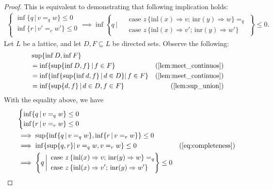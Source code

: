 \begin{proof}
   This is equivalent to demonstrating that following implication holds:
   \begin{align*}
    \begin{cases}
      \inf \{ q \, \vert \, v=_q w \} \leq 0 \\
      \inf \{ r \, \vert \, v'=_r w' \} \leq 0 \\
    \end{cases} \implies \inf \left\{q \, \bigg\vert \,  
    \begin{aligned}
       &\text{ case } z \,   \{\text{inl} (x) \Rightarrow v ; \, \text{inr} (y) \Rightarrow w\} =_{q} \\
       &\text{ case } z \,  \{\text{inl} (x) \Rightarrow v' ; \,\text{inr} (y) \Rightarrow w'\}
    \end{aligned}\right\} \leq 0.
   \end{align*}
Let $L$ be a lattice, and let $D, F \subseteq L$ be directed sets. Observe the following:
\begin{equation} \label{eq:completeness}
  \begin{split}
     & \sup \{ \inf D, \inf F \} \\\
    & = \inf \{ \sup \{\inf D, f\} \, \vert \, f \in F \} & (\text{\autoref{lem:meet_continuos}}) \\
    & = \inf \{ \inf\{ \sup \{\inf d, f\} \,\vert \, d \in D \} \vert \, f \in F \} & (\text{\autoref{lem:meet_continuos}}) \\
    & =  \inf \{  \sup \{d,f\} \, \vert \, d \in D, f \in F \} & (\text{\autoref{lem:sup_union}})
  \end{split}
  \end{equation}
With the equality above, we have
\begin{align*}
    &\begin{cases}
      \inf \{ q \, \vert \, v=_q w \} \leq 0 \\
      \inf \{ r \, \vert \, v=_r w \} \leq 0 \\
    \end{cases} \\
    &\implies  \sup \{ \inf \{ q \, \vert \, v=_q w \} , \inf \{ r \, \vert \, v=_r w \} \} \leq 0 \\
    & \implies \inf \{ \sup \{q,r\} \vert \,  v=_q w,  v=_r w  \} \leq 0 & (\text{\autoref{eq:completeness}})  \\
    & \implies \left\{q \, \bigg\vert \,  
    \begin{aligned}
       &\text{ case } z \,   \{\text{inl} (x) \Rightarrow v ; \, \text{inr} (y) \Rightarrow w\} =_{q}\\
        &\text{ case } z \,  \{\text{inl} (x) \Rightarrow v' ; \,\text{inr} (y) \Rightarrow w'\}
    \end{aligned}\right\} \leq 0
  \end{align*}


\end{proof}
